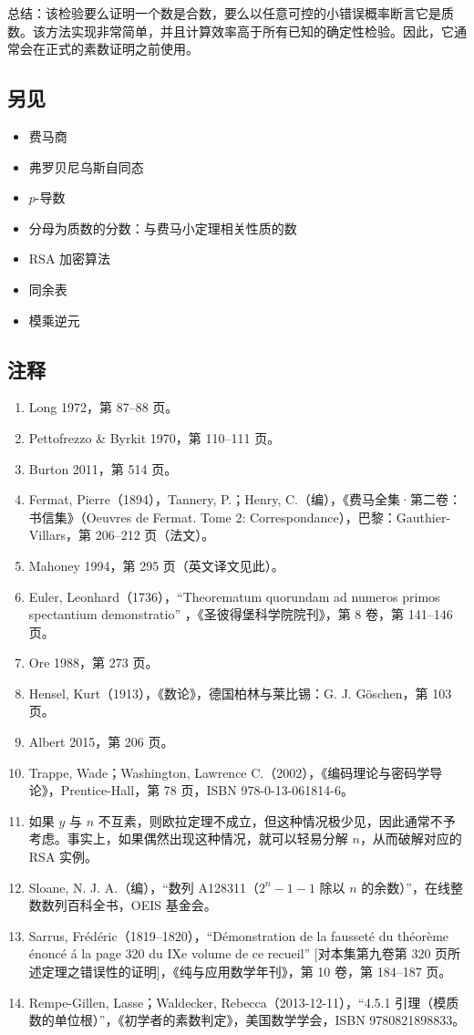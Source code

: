 总结：该检验要么证明一个数是合数，要么以任意可控的小错误概率断言它是质数。该方法实现非常简单，并且计算效率高于所有已知的确定性检验。因此，它通常会在正式的素数证明之前使用。
\subsection{另见}
\begin{itemize}
\item 费马商
\item 弗罗贝尼乌斯自同态
\item $p$-导数
\item 分母为质数的分数：与费马小定理相关性质的数
\item RSA 加密算法
\item 同余表
\item 模乘逆元
\end{itemize}
\subsection{注释}
\begin{enumerate}
\item Long 1972，第 87–88 页。
\item Pettofrezzo & Byrkit 1970，第 110–111 页。
\item Burton 2011，第 514 页。
\item Fermat, Pierre（1894），Tannery, P.；Henry, C.（编），《费马全集·第二卷：书信集》（Oeuvres de Fermat. Tome 2: Correspondance），巴黎：Gauthier-Villars，第 206–212 页（法文）。
\item Mahoney 1994，第 295 页（英文译文见此）。
\item Euler, Leonhard（1736），“Theorematum quorundam ad numeros primos spectantium demonstratio” ，《圣彼得堡科学院院刊》，第 8 卷，第 141–146 页。
\item Ore 1988，第 273 页。
\item Hensel, Kurt（1913），《数论》，德国柏林与莱比锡：G. J. Göschen，第 103 页。
\item Albert 2015，第 206 页。
\item Trappe, Wade；Washington, Lawrence C.（2002），《编码理论与密码学导论》，Prentice-Hall，第 78 页，ISBN 978-0-13-061814-6。
\item 如果 $y$ 与 $n$ 不互素，则欧拉定理不成立，但这种情况极少见，因此通常不予考虑。事实上，如果偶然出现这种情况，就可以轻易分解 $n$，从而破解对应的 RSA 实例。
\item Sloane, N. J. A.（编），“数列 A128311（$2^n - 1 - 1$ 除以 $n$ 的余数）”，在线整数数列百科全书，OEIS 基金会。
\item Sarrus, Frédéric（1819–1820），“Démonstration de la fausseté du théorème énoncé á la page 320 du IXe volume de ce recueil” [对本集第九卷第 320 页所述定理之错误性的证明]，《纯与应用数学年刊》，第 10 卷，第 184–187 页。
\item Rempe-Gillen, Lasse；Waldecker, Rebecca（2013-12-11），“4.5.1 引理（模质数的单位根）”，《初学者的素数判定》，美国数学学会，ISBN 9780821898833。
\end{enumerate}

